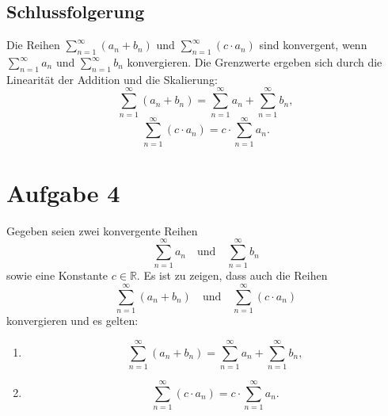 \documentclass[11pt]{article}
\begin{document}
\subsection*{Schlussfolgerung}
Die Reihen \(\sum_{n=1}^\infty (a_n + b_n)\) und \(\sum_{n=1}^\infty (c \cdot a_n)\) sind konvergent, wenn \(\sum_{n=1}^\infty a_n\) und \(\sum_{n=1}^\infty b_n\) konvergieren. Die Grenzwerte ergeben sich durch die Linearität der Addition und die Skalierung:
\[
\sum_{n=1}^\infty (a_n + b_n) = \sum_{n=1}^\infty a_n + \sum_{n=1}^\infty b_n,
\]
\[
\sum_{n=1}^\infty (c \cdot a_n) = c \cdot \sum_{n=1}^\infty a_n.
\]

\section*{Aufgabe 4}
Gegeben seien zwei konvergente Reihen
\[
\sum_{n=1}^\infty a_n \quad \text{und} \quad \sum_{n=1}^\infty b_n
\]
sowie eine Konstante \( c \in \mathbb{R} \). Es ist zu zeigen, dass auch die Reihen
\[
\sum_{n=1}^\infty (a_n + b_n) \quad \text{und} \quad \sum_{n=1}^\infty (c \cdot a_n)
\]
konvergieren und es gelten:
\begin{enumerate}[label=(\alph*)]
    \item \[
        \sum_{n=1}^\infty (a_n + b_n) = \sum_{n=1}^\infty a_n + \sum_{n=1}^\infty b_n,
    \]
    \item \[
        \sum_{n=1}^\infty (c \cdot a_n) = c \cdot \sum_{n=1}^\infty a_n.
    \]
\end{enumerate}
\end{document}
